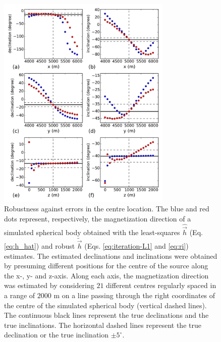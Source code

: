 \documentclass[journal abbreviation, npg]{copernicus}
\begin{document}
\begin{figure}[t]
\vspace*{2mm}
\begin{center}
\includegraphics[width=8.3cm]{Figures/Fig8.pdf}
\end{center}
\caption{Robustness against errors in the centre location. The blue and red dots represent, respectively, the magnetization direction of a simulated spherical body obtained with the least-squares $\hat{\vec{h}}$ (Eq. \ref{eq:h_hat}) and robust $\tilde{\vec{h}}$ (Eqs. \ref{eq:iteration-L1} and \ref{eq:ri}) estimates. The estimated declinations and inclinations were obtained by presuming different positions for the centre of the source along the x-, y- and z-axis. Along each axis, the magnetization direction was estimated by considering $21$ different centres regularly spaced in a range of $2000$ m on a line passing through the right coordinates of the centre of the simulated spherical body (vertical dashed lines). The continuous black lines represent the true declinations and the true inclinations. The horizontal dashed lines represent the true declination or the true inclination $\pm 5^{\circ}$.}
\label{fig:robust-center-results}
\end{figure}
\end{document}
